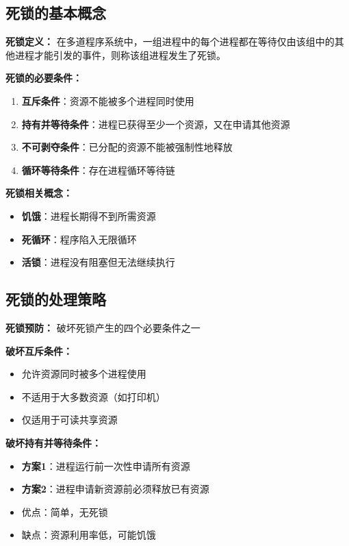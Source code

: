 \documentclass[lang=cn,newtx,10pt,scheme=chinese]{../../elegantbook}
\begin{document}
\subsection{死锁的基本概念}

\textbf{死锁定义：}
在多道程序系统中，一组进程中的每个进程都在等待仅由该组中的其他进程才能引发的事件，则称该组进程发生了死锁。

\textbf{死锁的必要条件：}
\begin{enumerate}
  \item \textbf{互斥条件}：资源不能被多个进程同时使用
  \item \textbf{持有并等待条件}：进程已获得至少一个资源，又在申请其他资源
  \item \textbf{不可剥夺条件}：已分配的资源不能被强制性地释放
  \item \textbf{循环等待条件}：存在进程循环等待链
\end{enumerate}

\textbf{死锁相关概念：}
\begin{itemize}
  \item \textbf{饥饿}：进程长期得不到所需资源
  \item \textbf{死循环}：程序陷入无限循环
  \item \textbf{活锁}：进程没有阻塞但无法继续执行
\end{itemize}

\subsection{死锁的处理策略}

\textbf{死锁预防：}
破坏死锁产生的四个必要条件之一

\textbf{破坏互斥条件：}
\begin{itemize}
  \item 允许资源同时被多个进程使用
  \item 不适用于大多数资源（如打印机）
  \item 仅适用于可读共享资源
\end{itemize}

\textbf{破坏持有并等待条件：}
\begin{itemize}
  \item \textbf{方案1}：进程运行前一次性申请所有资源
  \item \textbf{方案2}：进程申请新资源前必须释放已有资源
  \item 优点：简单，无死锁
  \item 缺点：资源利用率低，可能饥饿
\end{itemize}
\end{document}
